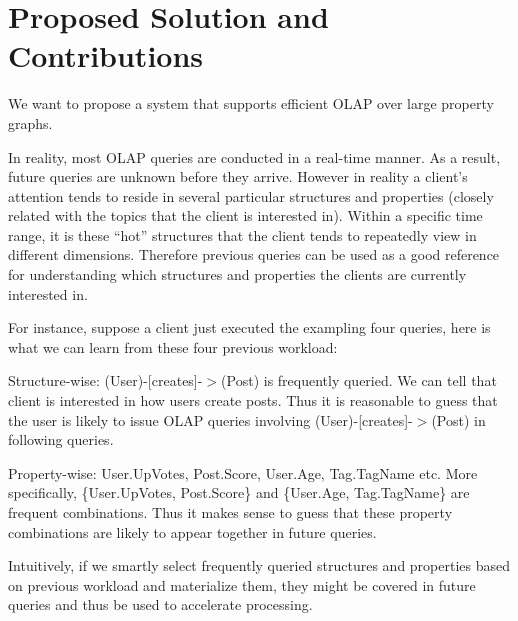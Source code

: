 	
	


\section{Proposed Solution and Contributions}
We want to propose a system that supports efficient  OLAP over large property graphs.

 In reality, most OLAP queries are conducted in a real-time manner. As a result, future queries are unknown before they arrive. However in reality a client’s attention tends to reside in several particular structures and properties (closely related with the topics that the client is interested in). Within a specific time range, it is these ``hot'' structures that the client tends to repeatedly view in different dimensions. Therefore previous queries can be used as a good reference for understanding which structures and properties the clients are currently interested in. 
 
For instance, suppose a client just executed the exampling four queries, here is what we can learn from these four previous workload:

Structure-wise: (User)-[creates]-$>$(Post) is frequently queried. We can tell that client is interested in how users create posts. Thus it is reasonable to guess that the user is likely to issue OLAP queries involving (User)-[creates]-$>$(Post) in following queries.
 
Property-wise: User.UpVotes, Post.Score, User.Age, Tag.TagName etc. More specifically, \{User.UpVotes, Post.Score\} and \{User.Age, Tag.TagName\} are frequent combinations. Thus it makes sense to guess that these property combinations are likely to appear together in future queries.
 
Intuitively, if we smartly select frequently queried structures and properties based on previous workload and materialize them, they might be covered in future queries and thus be used to accelerate processing. 
 
